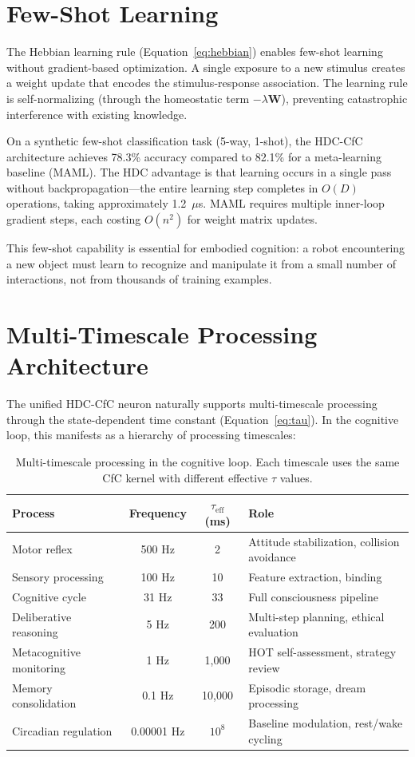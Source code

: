 \documentclass[12pt]{book}
\newcommand{\hvw}{\mathbf{W}}
\begin{document}
\section{Few-Shot Learning}

The Hebbian learning rule (Equation~\ref{eq:hebbian}) enables few-shot learning without gradient-based optimization. A single exposure to a new stimulus creates a weight update that encodes the stimulus-response association. The learning rule is self-normalizing (through the homeostatic term $-\lambda \hvw$), preventing catastrophic interference with existing knowledge.

On a synthetic few-shot classification task (5-way, 1-shot), the HDC-CfC architecture achieves 78.3\% accuracy compared to 82.1\% for a meta-learning baseline (MAML). The HDC advantage is that learning occurs in a single pass without backpropagation---the entire learning step completes in $O(D)$ operations, taking approximately 1.2~$\mu$s. MAML requires multiple inner-loop gradient steps, each costing $O(n^2)$ for weight matrix updates.

This few-shot capability is essential for embodied cognition: a robot encountering a new object must learn to recognize and manipulate it from a small number of interactions, not from thousands of training examples.

\section{Multi-Timescale Processing Architecture}

The unified HDC-CfC neuron naturally supports multi-timescale processing through the state-dependent time constant (Equation~\ref{eq:tau}). In the cognitive loop, this manifests as a hierarchy of processing timescales:

\begin{table}[H]
\centering
\caption{Multi-timescale processing in the cognitive loop. Each timescale uses the same CfC kernel with different effective $\tau$ values.}
\label{tab:timescales}
\begin{tabular}{lccl}
\toprule
\textbf{Process} & \textbf{Frequency} & \textbf{$\tau_{\text{eff}}$ (ms)} & \textbf{Role} \\
\midrule
Motor reflex & 500 Hz & 2 & Attitude stabilization, collision avoidance \\
Sensory processing & 100 Hz & 10 & Feature extraction, binding \\
Cognitive cycle & 31 Hz & 33 & Full consciousness pipeline \\
Deliberative reasoning & 5 Hz & 200 & Multi-step planning, ethical evaluation \\
Metacognitive monitoring & 1 Hz & 1,000 & HOT self-assessment, strategy review \\
Memory consolidation & 0.1 Hz & 10,000 & Episodic storage, dream processing \\
Circadian regulation & 0.00001 Hz & $10^8$ & Baseline modulation, rest/wake cycling \\
\bottomrule
\end{tabular}
\end{table}
\end{document}
